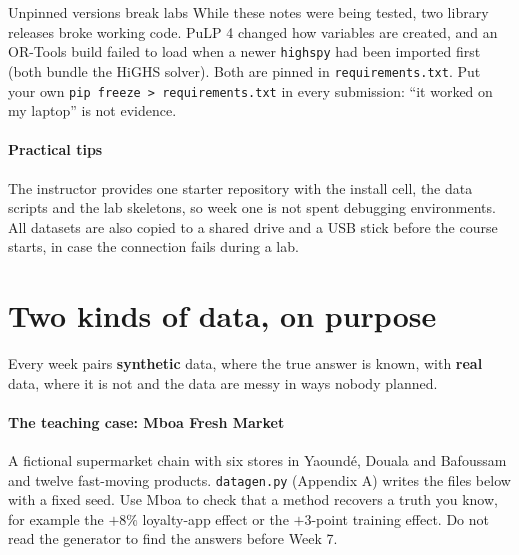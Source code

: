 \begin{pitfall}{Unpinned versions break labs}
While these notes were being tested, two library releases broke working code. PuLP 4 changed how variables are
created, and an OR-Tools build failed to load when a newer \texttt{highspy} had been imported first (both bundle the
HiGHS solver). Both are pinned in \texttt{requirements.txt}. Put your own \texttt{pip freeze > requirements.txt} in
every submission: ``it worked on my laptop'' is not evidence.
\end{pitfall}

\paragraph{Practical tips} The instructor provides one starter repository with the install cell, the data scripts
and the lab skeletons, so week one is not spent debugging environments. All datasets are also copied to a shared
drive and a USB stick before the course starts, in case the connection fails during a lab.

\section*{Two kinds of data, on purpose}
Every week pairs \textbf{synthetic} data, where the true answer is known, with \textbf{real} data, where it is not
and the data are messy in ways nobody planned.

\paragraph{The teaching case: Mboa Fresh Market} A fictional supermarket chain with six stores in Yaoundé, Douala and
Bafoussam and twelve fast-moving products. \texttt{datagen.py} (Appendix A) writes the files below with a fixed seed.
Use Mboa to check that a method recovers a truth you know, for example the $+8\%$ loyalty-app effect or the $+3$-point
training effect. Do not read the generator to find the answers before Week 7.

